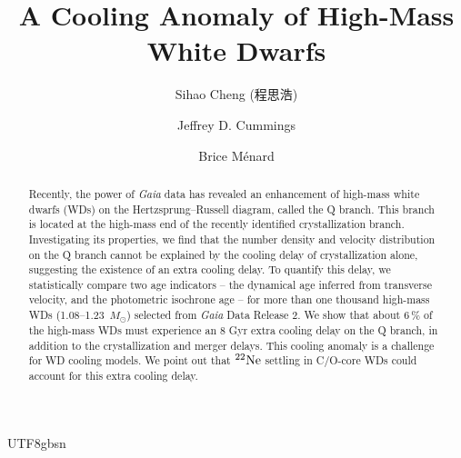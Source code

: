 \documentclass[twocolumn, times, trackchanges]{aastex63_bren}
\begin{document}
\begin{CJK*}{UTF8}{gbsn}
\submitjournal{\apj}

\author[0000-0002-9156-7461]{Sihao Cheng (程思浩)}

\author[0000-0001-7453-9947]{Jeffrey D. Cummings}

\author{Brice M\'enard}


\title{A Cooling Anomaly of High-Mass White Dwarfs}



\begin{abstract}
Recently, the power of {\it Gaia} data has revealed an enhancement of high-mass white dwarfs (WDs) on the Hertzsprung--Russell diagram, called the Q branch. This branch is located at the high-mass end of the recently identified crystallization branch. Investigating its properties, we find that the number density and velocity distribution on the Q branch cannot be explained by the cooling delay of crystallization alone, suggesting the existence of an extra cooling delay. To quantify this delay, we statistically compare two age indicators -- the dynamical age inferred from transverse velocity, and the photometric isochrone age -- for more than one thousand high-mass WDs (1.08--1.23~$M_\odot$) selected from {\it Gaia} Data Release 2. We show that about $6\,\%$ of the high-mass WDs must experience an 8 Gyr extra cooling delay on the Q branch, in addition to the crystallization and merger delays. This cooling anomaly is a challenge for WD cooling models. We point out that $\rm^{22}Ne$ settling in C/O-core WDs could account for this extra cooling delay.\\
\end{abstract}




\end{CJK*}
\end{document}
